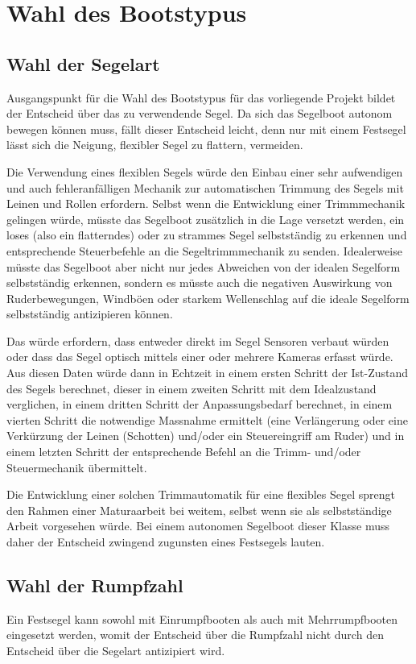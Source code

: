 \section{Wahl des Bootstypus}
\subsection{Wahl der Segelart}
Ausgangspunkt für die Wahl des Bootstypus für das vorliegende Projekt bildet der Entscheid über das zu verwendende Segel. Da sich das Segelboot autonom bewegen können muss, fällt dieser Entscheid leicht, denn nur mit einem Festsegel lässt sich die Neigung, flexibler Segel zu flattern, vermeiden. 

Die Verwendung eines flexiblen Segels würde den Einbau einer sehr 
aufwendigen und auch fehleranfälligen Mechanik zur automatischen Trimmung des Segels mit Leinen und Rollen erfordern. Selbst wenn die Entwicklung einer Trimmmechanik gelingen würde, müsste das Segelboot zusätzlich in die Lage versetzt werden, ein loses (also ein flatterndes) oder zu strammes Segel selbstständig zu erkennen und entsprechende Steuerbefehle an die Segeltrimmmechanik zu senden. Idealerweise müsste das Segelboot aber nicht nur jedes Abweichen von der idealen Segelform selbstständig erkennen, sondern es müsste auch die negativen Auswirkung von Ruderbewegungen, Windböen oder starkem Wellenschlag auf die ideale Segelform selbstständig antizipieren können. 

Das würde erfordern, dass entweder direkt im Segel Sensoren verbaut würden oder dass das Segel optisch mittels einer oder mehrere Kameras erfasst würde. Aus diesen Daten würde dann in Echtzeit in einem ersten Schritt der Ist-Zustand des Segels berechnet, dieser in einem zweiten Schritt mit dem Idealzustand verglichen, in einem dritten Schritt der Anpassungsbedarf berechnet, in einem vierten Schritt die notwendige Massnahme ermittelt (eine Verlängerung oder eine Verkürzung der Leinen (Schotten) und/oder ein Steuereingriff am Ruder) und in einem letzten Schritt der entsprechende Befehl an die Trimm- und/oder Steuermechanik übermittelt. 

Die Entwicklung einer solchen Trimmautomatik für eine flexibles Segel sprengt den Rahmen einer Maturaarbeit bei weitem, selbst wenn sie als selbstständige Arbeit vorgesehen würde. Bei einem autonomen Segelboot dieser Klasse muss daher der Entscheid zwingend zugunsten eines Festsegels lauten.
\subsection{Wahl der Rumpfzahl}
Ein Festsegel kann sowohl mit Einrumpfbooten als auch mit Mehrrumpfbooten eingesetzt werden, womit der Entscheid über die Rumpfzahl nicht durch den Entscheid über die Segelart antizipiert wird.  

